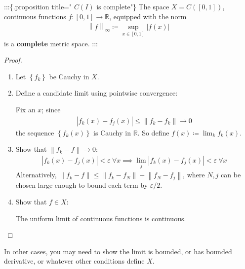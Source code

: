 :::\{.proposition title=" \(C(I)\) is complete"\} The space
\(X = C([0, 1])\), continuous functions \(f: [0, 1] \to {\mathbb{R}}\),
equipped with the norm
\begin{align*}
{\left\lVert {f} \right\rVert}_\infty \coloneqq\sup_{x\in [0, 1]} {\left\lvert {f(x)} \right\rvert}
\end{align*}
is a \textbf{complete} metric space. :::

\begin{proof}

\envlist

\begin{enumerate}
\def\labelenumi{\arabic{enumi}.}
\item
  Let \(\left\{{f_k}\right\}\) be Cauchy in \(X\).
\item
  Define a candidate limit using pointwise convergence:

  Fix an \(x\); since
  \begin{align*}
    {\left\lvert {f_k(x) - f_j(x)} \right\rvert}  \leq {\left\lVert {f_k - f_k} \right\rVert} \to 0
    \end{align*}
  the sequence \(\left\{{f_k(x)}\right\}\) is Cauchy in
  \({\mathbb{R}}\). So define \(f(x) \coloneqq\lim_k f_k(x)\).
\item
  Show that \({\left\lVert {f_k - f} \right\rVert} \to 0\):
  \begin{align*}
    {\left\lvert {f_k(x) - f_j(x)} \right\rvert} < \varepsilon ~\forall x \implies \lim_{j} {\left\lvert {f_k(x) - f_j(x)} \right\rvert} <\varepsilon ~\forall x
    \end{align*}
  Alternatively,
  \({\left\lVert {f_k-f} \right\rVert} \leq {\left\lVert {f_k - f_N} \right\rVert} + {\left\lVert {f_N - f_j} \right\rVert}\),
  where \(N, j\) can be chosen large enough to bound each term by
  \(\varepsilon/2\).
\item
  Show that \(f\in X\):

  The uniform limit of continuous functions is continuous.
\end{enumerate}

\end{proof}

\begin{remark}

In other cases, you may need to show the limit is bounded, or has
bounded derivative, or whatever other conditions define \(X\).

\end{remark}


